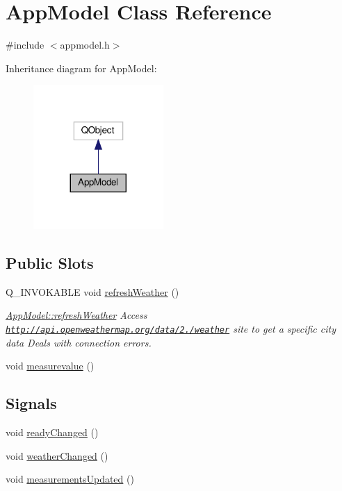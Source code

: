 \hypertarget{class_app_model}{}\section{App\+Model Class Reference}
\label{class_app_model}


{\ttfamily \#include $<$appmodel.\+h$>$}



Inheritance diagram for App\+Model\+:\nopagebreak
\begin{figure}[H]
\begin{center}
\leavevmode
\includegraphics[width=140pt]{class_app_model__inherit__graph}
\end{center}
\end{figure}
\subsection*{Public Slots}
\begin{DoxyCompactItemize}
\item 
Q\+\_\+\+I\+N\+V\+O\+K\+A\+B\+LE void \hyperlink{class_app_model_a37e1da9d028779f7f0fc908e4c04fa76}{refresh\+Weather} ()
\begin{DoxyCompactList}\small\item\em \hyperlink{class_app_model_a37e1da9d028779f7f0fc908e4c04fa76}{App\+Model\+::refresh\+Weather} Access \href{http://api.openweathermap.org/data/2.5/weather}{\tt http\+://api.\+openweathermap.\+org/data/2./weather} site to get a specific city data Deals with connection errors. \end{DoxyCompactList}\item 
void \hyperlink{class_app_model_a51e3556fa389b11c251a0a94f0a5655c}{measurevalue} ()
\end{DoxyCompactItemize}
\subsection*{Signals}
\begin{DoxyCompactItemize}
\item 
void \hyperlink{class_app_model_a574c2bd6f5c92ac9268107f8399989cb}{ready\+Changed} ()
\item 
void \hyperlink{class_app_model_a83e61455ed5672333b0db45f3f86417c}{weather\+Changed} ()
\item 
void \hyperlink{class_app_model_a1d9a24aeaab75b815f6500e9521dc091}{measurements\+Updated} ()
\end{DoxyCompactItemize}
